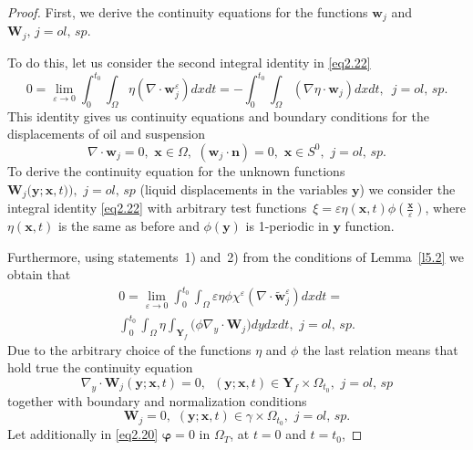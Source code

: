 \documentclass{article}
\theoremstyle{plain}
\theoremstyle{definition}
\numberwithin{equation}{section}
\begin{document}
\begin{proof}
First, we derive the continuity equations for the functions $\boldsymbol{w}_{j}$ and $\boldsymbol{W}_{j},\,j=ol,\,sp.$

To do this, let us consider the second integral identity in \eqref{eq2.22}
\begin{equation*}
0=\lim_{\varepsilon\rightarrow{0}}\int_{0}^{{t}_{0}}
\int_{\Omega}{\eta}(\nabla\cdot\boldsymbol{w}^{\varepsilon}_{j})dxdt=
-\int_{0}^{{t}_{0}}\int_{\Omega}(\nabla{\eta}\cdot\boldsymbol{w}_{j})dxdt,\,\,\,j=ol,\,sp.
\end{equation*}
This identity gives us continuity equations and boundary conditions for the displacements of oil and suspension
\begin{equation}\label{eq5.5}
\nabla\cdot\boldsymbol{w}_{j}=0,\,\,\boldsymbol{x}\in\Omega,\,\,(\boldsymbol{w}_{j}\cdot\boldsymbol{n})=0, \,\,\boldsymbol{x}\in{S}^{0},\,\,j=ol,\,sp.
\end{equation}
To derive the continuity equation for the unknown functions
$\boldsymbol{W}_{j}\big(\boldsymbol{y};\boldsymbol{x},t)\big),\,\,j=ol,\,sp$
(liquid displacements in the variables $\boldsymbol{y}$) we consider the integral identity \eqref{eq2.22} with arbitrary test functions $\displaystyle\,{\xi}=\varepsilon{\eta}(\boldsymbol{x},t)\phi(\frac{\boldsymbol{x}}{\varepsilon})$, where ${\eta}(\boldsymbol{x},t)$ is the same as before and $\phi(\boldsymbol{y})$ is 1-periodic in $\boldsymbol{y}$ function.

Furthermore, using statements~1) and~2) from the conditions of Lemma~\ref{l5.2} we obtain that
\begin{multline}\label{eq5.6}
0=\lim_{\varepsilon\rightarrow{0}}\int_{0}^{{t}_{0}}
\int_{\Omega}\varepsilon{\eta}\phi\chi^{\varepsilon}
(\nabla\cdot\widetilde{\boldsymbol{w}}_{j}^{\varepsilon})dxdt=
\\
\int_{0}^{{t}_{0}}\int_{\Omega}{\eta}\int_{\textbf{Y}_{f}}
\big(\phi\nabla_{y}\cdot\boldsymbol{W}_{j}\big)dydxdt,\,\,j=ol,\,sp.
\end{multline}
Due to the arbitrary choice of the functions ${\eta}$ and $\phi$ the last relation means that hold true the
continuity equation
\begin{equation}\label{eq5.7}
\nabla_{y}\cdot\boldsymbol{W}_{j}(\boldsymbol{y};\boldsymbol{x},t)=0,\,\,\,
(\boldsymbol{y};\boldsymbol{x},t)\in\textbf{Y}_{f}\times\Omega_{t_{0}},\,\,j=ol,\,sp
\end{equation}
together with boundary and normalization conditions
\begin{equation}\label{eq5.8}
\boldsymbol{W}_{j}=0,\,\,(\boldsymbol{y};\boldsymbol{x},t)\in\gamma\times\Omega_{t_{0}},\,\,j=ol,\,sp.
\end{equation}
Let additionally in \eqref{eq2.20} $\boldsymbol{\varphi}=0$ in $\Omega_{T}$, at $t=0$ and $t=t_{0}$,


\end{proof}
\end{document}
